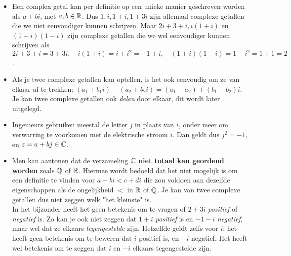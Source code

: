 \documentclass{ximera}
\begin{document}
\begin{remark} \nl
\begin{itemize}
	\item Een complex getal kan per definitie op een unieke manier geschreven worden als $a+bi$, met $a,b\in\mathbb{R}$. Dus $1, i, 1+i, 1+3i$ zijn allemaal complexe getallen die we niet eenvoudiger kunnen schrijven. Maar $2i+3+i, i(1+i)$ en $(1+i)(1-i)$ zijn complexe getallen die we wel eenvoudiger kunnen schrijven als $2i+3+i=3+3i, \quad i(1+i)=i+i^2 =-1+i,\quad  (1+i)(1-i) = 1 - i^2 = 1+1 =2$.
    
    \item Als je twee complexe getallen kan optellen, is het ook eenvoudig om ze van elkaar af te trekken: $(a_1+b_1i)-(a_2+b_2i) = (a_1-a_2)+(b_1-b_2)i$. Je kan twee complexe getallen ook \textit{delen} door elkaar, dit wordt later uitgelegd.
    
	\item Ingenieurs gebruiken meestal de letter $j$ in plaats van $i$, onder meer om verwarring te voorkomen met de elektrische stroom $i$. Dan geldt dus $j^2=-1$, en $z=a+bj\in\mathbb{C}$.
	
	\item 
	Men kan aantonen dat de verzameling $\mathbb{C}$ \textbf{niet totaal kan geordend worden} zoals $\mathbb{Q}$ of $\mathbb{R}$. Hiermee wordt bedoeld dat het niet mogelijk is om een definitie te vinden voor $a+bi <c+di$ die zou voldoen aan dezelfde eigenschappen als de ongelijkheid $<$ in $\mathbb{R}$ of $\mathbb{Q}$. Je kan van twee complexe getallen dus niet zeggen welk "het kleinste" is.
	\\ 
	In het bijzonder heeft het geen betekenis om te vragen of $2+3i$ \textit{positief} of \textit{negatief} is. 
	Zo kan je ook niet zeggen dat $1+i$ \textit{positief} is en $-1-i$ \textit{ negatief}, maar wel dat ze elkaars \textit{tegengestelde} zijn. Hetzelfde geldt zelfs voor $i$: het heeft geen betekenis om te beweren dat $i$ positief is, en $-i$ negatief. Het heeft wel betekenis om te zeggen dat $i$ en $-i$ elkaars tegengestelde zijn.
    
\end{itemize}
\end{remark}
\end{document}
